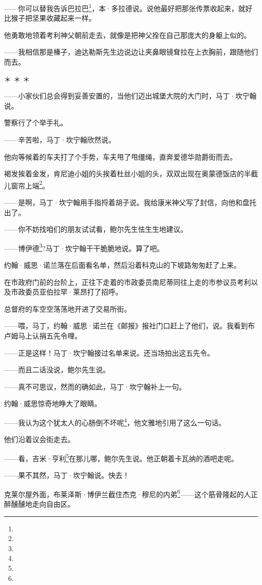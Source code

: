 \par ——你可以替我告诉巴拉巴\footnote{}，本·多拉德说。说他最好把那张传票收起来，就好比猴子把坚果收藏起来一样。
\par 他勇敢地领着考利神父朝前走去，就像是把神父拴在自己那庞大的身躯上似的。
\par ——我相信那是榛子，迪达勒斯先生边说边让夹鼻眼镜耷拉在上衣胸前，跟随他们而去。
\par ＊ ＊ ＊
\par ——小家伙们总会得到妥善安置的，当他们迈出城堡大院的大门时，马丁·坎宁翰说。
\par 警察行了个举手礼。
\par ——辛苦啦，马丁·坎宁翰欣然说。
\par 他向等候着的车夫打了个手势，车夫甩了甩缰绳，直奔爱德华勋爵街而去。
\par 褐发挨着金发，肯尼迪小姐的头挨着杜丝小姐的头，双双出现在奥蒙德饭店的半截儿窗帘上端\footnote{}。
\par ——是啊，马丁·坎宁翰用手指捋着胡子说。我给康米神父写了封信，向他和盘托出了。
\par ——你不妨找咱们的朋友试试看，鲍尔先生怯生生地建议。
\par ——博伊德\footnote{}?马丁·坎宁翰干干脆脆地说。算了吧。
\par 约翰·威思·诺兰落在后面看名单，然后沿着科克山的下坡路匆匆赶了上来。
\par 在市政府门前的台阶上，正往下走着的市政委员南尼蒂同往上走的市参议员考利以及市政委员亚伯拉罕·莱昂打了招呼。
\par 总督府的车空空荡荡地开进了交易所街。
\par ——喂，马丁，约翰·威思·诺兰在《邮报》报社门口赶上了他们，说。我看到布卢姆马上认捐五先令哩。
\par ——正是这样！马丁·坎宁翰接过名单来说。还当场拍出这五先令。
\par ——而且二话没说，鲍尔先生说。
\par ——真不可思议，然而的确如此，马丁·坎宁翰补上一句。
\par 约翰·威思惊奇地睁大了眼睛。
\par ——我认为这个犹太人的心肠倒不坏呢\footnote{}，他文雅地引用了这么一句话。
\par 他们沿着议会街走去。
\par ——看，吉米·亨利\footnote{}在那儿哪，鲍尔先生说。他正朝着卡瓦纳的酒吧走呢。
\par ——果不其然，马丁·坎宁翰说。快去！
\par 克莱尔屋外面，布莱泽斯·博伊兰截住杰克·穆尼的内弟\footnote{}——这个筋骨隆起的人正醉醺醺地走向自由区。

